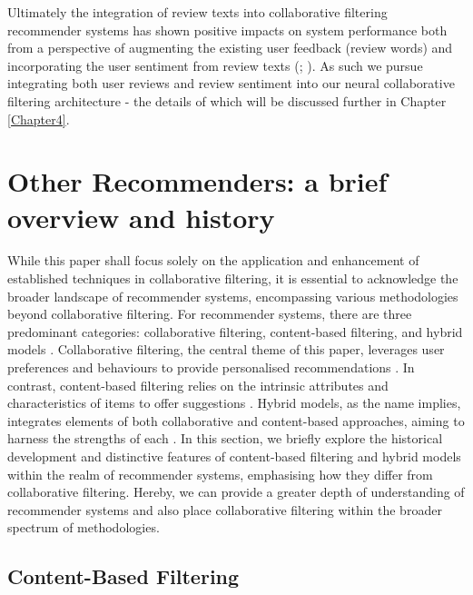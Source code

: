 Ultimately the integration of review texts into collaborative filtering recommender systems has shown positive impacts on system performance both from a perspective of augmenting the existing user feedback (review words) and incorporating the user sentiment from review texts (\cite{dang2020sentiment}; \cite{hernandez2019comparative}). As such we pursue integrating both user reviews and review sentiment into our neural collaborative filtering architecture - the details of which will be discussed further in Chapter \ref{Chapter4}.


\section{Other Recommenders: a brief overview and history}
\label{sec:2 Other Recommenders: a brief overview and history}

While this paper shall focus solely on the application and enhancement of established techniques in collaborative filtering, it is essential to acknowledge the broader landscape of recommender systems, encompassing various methodologies beyond collaborative filtering. For recommender systems, there are three predominant categories: collaborative filtering, content-based filtering, and hybrid models \cite{sarwar2000analysis}. Collaborative filtering, the central theme of this paper, leverages user preferences and behaviours to provide personalised recommendations \cite{smith2017two}. In contrast, content-based filtering relies on the intrinsic attributes and characteristics of items to offer suggestions \cite{lops2011content}. Hybrid models, as the name implies, integrates elements of both collaborative and content-based approaches, aiming to harness the strengths of each \cite{thorat2015survey}. In this section, we briefly explore the historical development and distinctive features of content-based filtering and hybrid models within the realm of recommender systems, emphasising how they differ from collaborative filtering. Hereby, we can provide a greater depth of understanding of recommender systems and also place collaborative filtering within the broader spectrum of methodologies.



\subsection{Content-Based Filtering}
\label{subsec:2 Content-Based Filtering}

